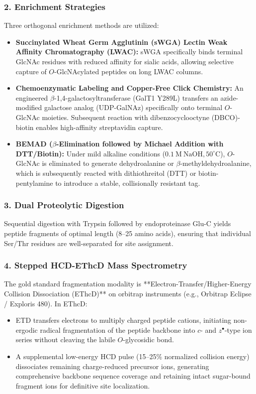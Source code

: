 \subsubsection{2. Enrichment Strategies}
Three orthogonal enrichment methods are utilized:
\begin{itemize}
    \item \textbf{Succinylated Wheat Germ Agglutinin (sWGA) Lectin Weak Affinity Chromatography (LWAC):} sWGA specifically binds terminal GlcNAc residues with reduced affinity for sialic acids, allowing selective capture of $O$-GlcNAcylated peptides on long LWAC columns.
    \item \textbf{Chemoenzymatic Labeling and Copper-Free Click Chemistry:} An engineered $\beta$-1,4-galactosyltransferase (GalT1 Y289L) transfers an azide-modified galactose analog (UDP-GalNAz) specifically onto terminal $O$-GlcNAc moieties. Subsequent reaction with dibenzocyclooctyne (DBCO)-biotin enables high-affinity streptavidin capture.
    \item \textbf{BEMAD ($\beta$-Elimination followed by Michael Addition with DTT/Biotin):} Under mild alkaline conditions ($0.1~\text{M}~\text{NaOH}, 50^\circ\text{C}$), $O$-GlcNAc is eliminated to generate dehydroalanine or $\beta$-methyldehydroalanine, which is subsequently reacted with dithiothreitol (DTT) or biotin-pentylamine to introduce a stable, collisionally resistant tag.
\end{itemize}

\subsubsection{3. Dual Proteolytic Digestion}
Sequential digestion with Trypsin followed by endoproteinase Glu-C yields peptide fragments of optimal length (8--25 amino acids), ensuring that individual Ser/Thr residues are well-separated for site assignment.

\subsubsection{4. Stepped HCD-EThcD Mass Spectrometry}
The gold standard fragmentation modality is **Electron-Transfer/Higher-Energy Collision Dissociation (EThcD)** on orbitrap instruments (e.g., Orbitrap Eclipse / Exploris 480). In EThcD:
\begin{itemize}
    \item ETD transfers electrons to multiply charged peptide cations, initiating non-ergodic radical fragmentation of the peptide backbone into $c$- and $z^\bullet$-type ion series without cleaving the labile $O$-glycosidic bond.
    \item A supplemental low-energy HCD pulse (15--25\% normalized collision energy) dissociates remaining charge-reduced precursor ions, generating comprehensive backbone sequence coverage and retaining intact sugar-bound fragment ions for definitive site localization.
\end{itemize}

